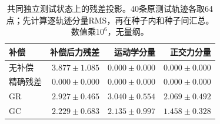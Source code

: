 \begin{table}[t]
\centering\small\setlength{\tabcolsep}{4pt}
\caption{共同独立测试状态上的残差投影。40条原测试轨迹各取64点；先计算逐轨迹分量RMS，再在种子内和种子间汇总。数值乘$10^6$，无量纲。}
\label{tab:control_test_force}
\begin{tabular}{lrrr}
\toprule
补偿 & 补偿后力残差 & 运动学分量 & 正交力分量 \\
\midrule
无补偿 & $3.877\pm1.085$ & $0.000\pm0.000$ & $0.000\pm0.000$ \\
精确残差 & $0.000\pm0.000$ & $0.000\pm0.000$ & $0.000\pm0.000$ \\
GR & $2.927\pm0.465$ & $3.040\pm0.554$ & $2.069\pm0.492$ \\
GC & $2.229\pm0.683$ & $2.135\pm0.997$ & $1.458\pm0.328$ \\
\bottomrule
\end{tabular}
\end{table}
